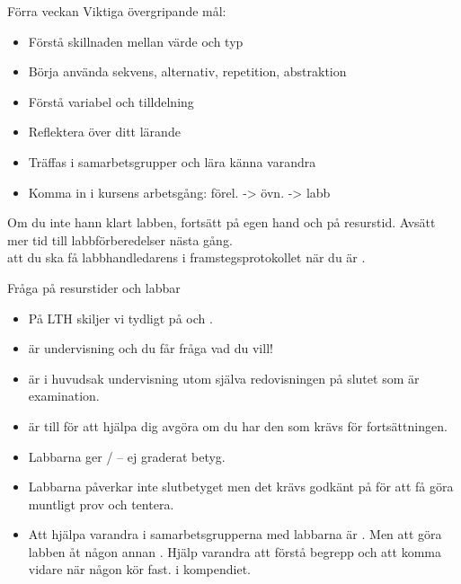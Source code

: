 

\begin{SlideExtra}{Förra veckan}
Viktiga övergripande mål:
\begin{itemize}
\item Förstå skillnaden mellan värde och typ
\item Börja använda sekvens, alternativ, repetition, abstraktion
\item Förstå variabel och tilldelning
\item Reflektera över ditt lärande
\item Träffas i samarbetsgrupper och lära känna varandra
\item Komma in i kursens arbetsgång: förel. -> övn. -> labb
\end{itemize}
Om du inte hann klart labben, fortsätt på egen hand och på resurstid. Avsätt mer tid till labbförberedelser nästa gång.
\\ 
 att du ska få labbhandledarens  i framstegsprotokollet när du är .
\end{SlideExtra}

\begin{SlideExtra}{Fråga på resurstider och labbar}
\begin{itemize}
  \item På LTH skiljer vi tydligt på  och .
  \item {} är undervisning och du får fråga vad du vill!
  \item {} är i huvudsak undervisning utom själva redovisningen på slutet som är examination. 
  \item {} är till för att hjälpa dig avgöra om du har den  som krävs för fortsättningen.
  \item Labbarna ger / -- ej graderat betyg. 
  \item Labbarna påverkar inte slutbetyget men det krävs godkänt på   för att få göra muntligt prov och tentera.
  \item Att hjälpa varandra i samarbetsgrupperna med labbarna är . Men att göra labben åt någon annan . Hjälp varandra att förstå begrepp och att komma vidare när någon kör fast.  i kompendiet.
\end{itemize}  
\end{SlideExtra}


